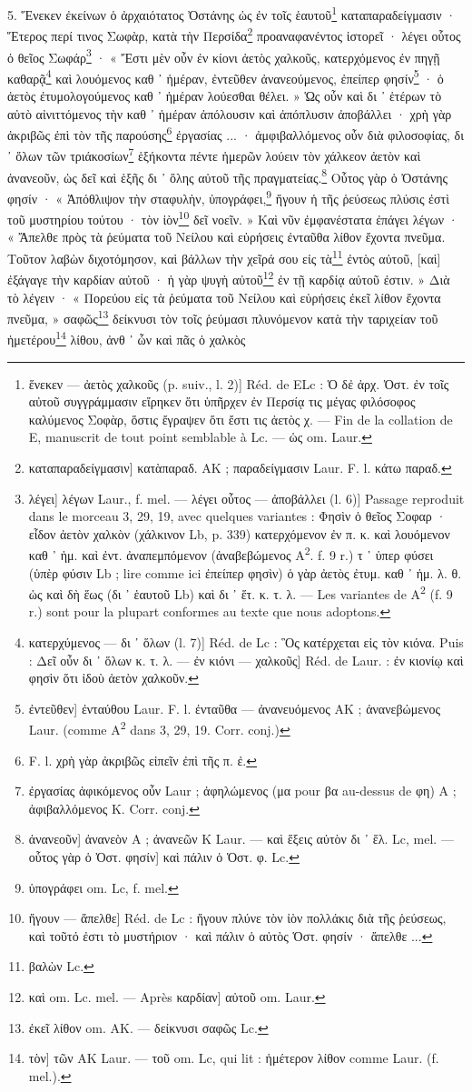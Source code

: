 \documentclass[a4paper, 11pt, oneside, polutonikogreek, french]{article}
\begin{document}
5. Ἕνεκεν ἐκείνων ὁ ἀρχαιότατος Ὀστάνης ὡς ἐν τοῖς ἑαυτοῦ\footnote{ἕνεκεν --- ἀετὸς χαλκοῦς (p. suiv., l. 2)] Réd. de ELc : Ὁ δἐ ἀρχ. Ὀστ. ἐν τοῖς αὐτοῦ συγγράμμασιν εἴρηκεν ὅτι ὑπῆρχεν ἐν Περσίᾳ τις μέγας φιλόσοφος καλύμενος Σοφὰρ, ὅστις ἔγραψεν ὅτι ἔστι τις ἀετὸς χ. --- Fin de la collation de E, manuscrit de tout point semblable à Lc. --- ὡς om. Laur.} καταπαραδείγμασιν · Ἕτερος περί τινος Σωφὰρ, κατὰ τὴν Περσίδα\footnote{καταπαραδείγμασιν] κατὰπαραδ. AΚ ; παραδείγμασιν Laur. F. l. κάτω παραδ.} προαναφανέντος ἱστορεῖ · λέγει οὗτος ὀ θεῖος Σωφάρ\footnote{λέγει] λέγων Laur., f. mel. --- λέγει οὖτος --- ἀποβάλλει (l. 6)] Passage reproduit dans le morceau 3, 29, 19, avec quelques variantes : Φησὶν ὁ θεῖος Σοφαρ · εἶδον ἀετὸν χαλκὸν (χάλκινον Lb, p. 339) κατερχόμενον ἐν π. κ. καὶ λουόμενον καθ ᾽ ἡμ. καὶ ἐντ. ἀναπεμπόμενον (ἀναβεβώμενος A\textsuperscript{2}. f. 9 r.) τ ᾽ ὑπερ φύσει (ὑπὲρ φύσιν Lb ; lire comme ici ἐπείπερ φησὶν) ὁ γὰρ ἀετὸς ἐτυμ. καθ ᾽ ἡμ. λ. θ. ὡς καὶ δὴ ἕως (δι ᾽ ἑαυτοῦ Lb) καὶ δι ᾽ ἕτ. κ. τ. λ. --- Les variantes de A\textsuperscript{2} (f. 9 r.) sont pour la plupart conformes au texte que nous adoptons.} · « Ἔστι μὲν οὖν ἐν κίονι ἀετὸς χαλκοῦς, κατερχόμενος ἐν πηγῇ καθαρᾷ\footnote{κατερχύμενος --- δι ᾽ ὅλων (l. 7)] Réd. de Lc : Ὃς κατέρχεται εἰς τὸν κιόνα. Puis : Δεῖ οὖν δι ᾽ ὅλων κ. τ. λ. --- ἐν κιόνι --- χαλκοῦς] Réd. de Laur. : ἐν κιονίῳ καὶ φησὶν ὅτι ἰδοὺ ἀετὸν χαλκοῦν.} καὶ λουόμενος καθ ᾽ ἡμέραν, ἐντεῦθεν ἀνανεούμενος, ἐπείπερ φησίν\footnote{ἐντεῦθεν] ἐνταύθου Laur. F. l. ἐνταῦθα --- ἀνανευόμενος AΚ ; ἀνανεβώμενος Laur. (comme A\textsuperscript{2} dans 3, 29, 19. Corr. conj.)} · ὁ ἀετὸς ἐτυμολογούμενος καθ ᾽ ἡμέραν λούεσθαι θέλει. » Ὡς οὖν καὶ δι ᾽ ἑτέρων τὸ αὐτὸ αἰνιττόμενος τὴν καθ ᾽ ἡμέραν ἀπόλουσιν καὶ ἀπόπλυσιν ἀποβάλλει · χρὴ γὰρ ἀκριβῶς ἐπὶ τὸν τῆς παρούσης\footnote{F. l. χρὴ γὰρ ἀκριβῶς εἰπεῖν ἐπὶ τῆς π. ἐ.} ἐργασίας ... · ἀμφιβαλλόμενος οὖν διὰ φιλοσοφίας, δι ᾽ ὅλων τῶν τριάκοσίων\footnote{ἐργασίας ἀφικόμενος οὖν Laur ; ἀφηλώμενος (μα pour βα au-dessus de φη) A ; ἀφιβαλλόμενος K. Corr. conj.} ἑξήκοντα πέντε ἡμερῶν λούειν τὸν χάλκεον ἀετὸν καὶ ἀνανεοῦν, ὡς δεῖ καὶ ἑξῆς δι ᾽ ὅλης αὐτοῦ τῆς πραγματείας.\footnote{ἀνανεοῦν] ἀνανεὸν A ; ἀνανεῶν Κ Laur. --- καὶ ἕξεις αὐτὸν δι ᾽ ἕλ. Lc, mel. --- οὗτος γὰρ ὁ Ὀστ. φησίν] καὶ πάλιν ὁ Ὁστ.  φ. Lc.} Οὗτος γὰρ ὁ Ὀστάνης φησίν · « Ἀπόθλιψον τὴν σταφυλὴν, ὑπογράφει,\footnote{ὑπογράφει om. Lc, f. mel.} ἤγουν ἡ τῆς ῥεύσεως πλύσις ἐστὶ τοῦ μυστηρίου τούτου · τὸν ἰὸν\footnote{ἤγουν --- ἄπελθε] Réd. de Lc : ἤγουν πλύνε τὸν ἰὸν πολλάκις διὰ τῆς ῥεύσεως, καὶ τοῦτό ἐστι τὸ μυστήριον · καὶ πάλιν ὁ αὐτὸς Ὁστ. φησίν · ἄπελθε ...} δεῖ νοεῖν. » Καὶ νῦν ἐμφανέστατα ἐπάγει λέγων · « Ἄπελθε πρὸς τὰ ῥεύματα τοῦ Νείλου καὶ εὑρήσεις ἐνταῦθα λίθον ἔχοντα πνεῦμα. Τοῦτον λαβὼν διχοτόμησον, καὶ βάλλων τὴν χεῖρά σου εἰς τὰ\footnote{βαλὼν Lc.} ἐντὸς αὐτοῦ, [καὶ] ἐξάγαγε τὴν καρδίαν αὐτοῦ · ἡ γὰρ ψυγὴ αὐτοῦ\footnote{καὶ om. Lc. mel. --- Après καρδίαν] αὐτοῦ om. Laur.} ἐν τῇ καρδίᾳ αὐτοῦ ἐστιν. » Διὰ τὸ λέγειν · « Πορεύου εἰς τὰ ῥεύματα τοῦ Νείλου καὶ εὑρήσεις ἐκεῖ λίθον ἔχοντα πνεῦμα, » σαφῶς\footnote{ἐκεῖ λίθον om. AK. --- δείκνυσι σαφῶς Lc.} δείκνυσι τὸν τοῖς ῥεύμασι πλυνόμενον κατὰ τὴν ταριχείαν τοῦ ἡμετέρου\footnote{τὸν] τῶν AK Laur. --- τοῦ om. Lc, qui lit : ἡμέτερον λίθον comme Laur. (f. mel.).} λίθου, ἀνθ ᾽ ὧν καὶ πᾶς ὁ χαλκὸς 
\end{document}
